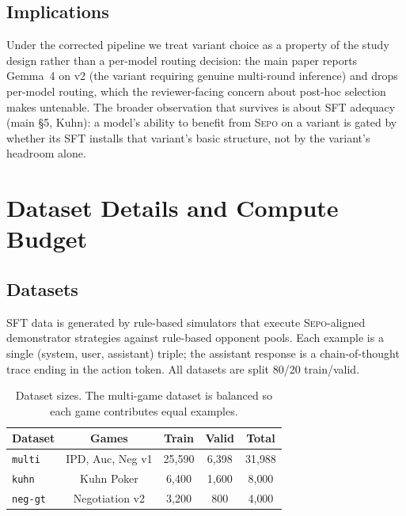 \documentclass[letterpaper]{article} %
\newcommand{\sepo}{\textsc{Sepo}}
\begin{document}
\subsection{Implications}
Under the corrected pipeline we treat variant choice as a property of the study design rather than a per-model routing decision: the main paper reports Gemma~4 on v2 (the variant requiring genuine multi-round inference) and drops per-model routing, which the reviewer-facing concern about post-hoc selection makes untenable. The broader observation that survives is about SFT adequacy (main \S5, Kuhn): a model's ability to benefit from \sepo{} on a variant is gated by whether its SFT installs that variant's basic structure, not by the variant's headroom alone.
\section{Dataset Details and Compute Budget}
\label{app:datasets-compute}
\subsection{Datasets}
\label{app:datasets}
SFT data is generated by rule-based simulators that execute \sepo{}-aligned demonstrator strategies against rule-based opponent pools. Each example is a single (system, user, assistant) triple; the assistant response is a chain-of-thought trace ending in the action token. All datasets are split 80/20 train/valid.
\begin{table}[h]
\centering
\small
\setlength{\tabcolsep}{4pt}
\begin{tabular}{@{}lcccc@{}}
\toprule
\textbf{Dataset} & \textbf{Games} & \textbf{Train} & \textbf{Valid} & \textbf{Total} \\
\midrule
\texttt{multi}    & IPD, Auc, Neg v1 & 25{,}590 & 6{,}398 & 31{,}988 \\
\texttt{kuhn}     & Kuhn Poker       & 6{,}400  & 1{,}600 & 8{,}000 \\
\texttt{neg-gt}   & Negotiation v2   & 3{,}200  & 800     & 4{,}000 \\
\bottomrule
\end{tabular}
\caption{Dataset sizes. The multi-game dataset is balanced so each game contributes equal examples.}
\label{tab:dataset-overview}
\end{table}
\end{document}
